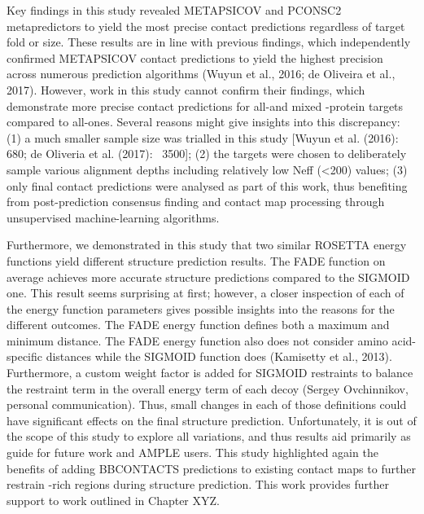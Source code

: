 Key findings in this study revealed METAPSICOV and PCONSC2 metapredictors to yield the most precise contact predictions regardless of target fold or size. These results are in line with previous findings, which independently confirmed METAPSICOV contact predictions to yield the highest precision across numerous prediction algorithms (Wuyun et al., 2016; de Oliveira et al., 2017). However, work in this study cannot confirm their findings, which demonstrate more precise contact predictions for all-\textbeta and mixed \textalpha-\textbeta protein targets compared to all-\textalpha ones. Several reasons might give insights into this discrepancy: (1) a much smaller sample size was trialled in this study [Wuyun et al. (2016): 680; de Oliveria et al. (2017): ~3500]; (2) the targets were chosen to deliberately sample various alignment depths including relatively low Neff (\textless 200) values; (3) only final contact predictions were analysed as part of this work, thus benefiting from post-prediction consensus finding and contact map processing through unsupervised machine-learning algorithms.

Furthermore, we demonstrated in this study that two similar ROSETTA energy functions yield different structure prediction results. The FADE function on average achieves more accurate structure predictions compared to the SIGMOID one. This result seems surprising at first; however, a closer inspection of each of the energy function parameters gives possible insights into the reasons for the different outcomes. The FADE energy function defines both a maximum and minimum distance. The FADE energy function also does not consider amino acid-specific distances while the SIGMOID function does (Kamisetty et al., 2013). Furthermore, a custom weight factor is added for SIGMOID restraints to balance the restraint term in the overall energy term of each decoy (Sergey Ovchinnikov, personal communication). Thus, small changes in each of those definitions could have significant effects on the final structure prediction. Unfortunately, it is out of the scope of this study to explore all variations, and thus results aid primarily as guide for future work and AMPLE users. This study highlighted again the benefits of adding BBCONTACTS predictions to existing contact maps to further restrain \textbeta-rich regions during structure prediction. This work provides further support to work outlined in Chapter XYZ.


